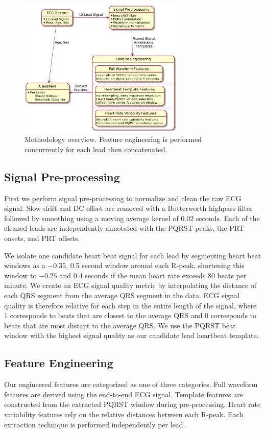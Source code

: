 \documentclass[twocolumn]{cinc}
\begin{document}
\begin{figure}[ht]
  \centering
  \includegraphics[width=7.9cm]{fig/methodology.png}
  \caption{Methodology overview. Feature engineering is performed concurrently for each lead then concatenated.}
  \label{fig:methodology}
\end{figure}

\subsection{Signal Pre-processing}

First we perform signal pre-processing to normalize and clean the raw ECG signal.
Slow drift and DC offset are removed with a Butterworth highpass filter followed by smoothing using a moving average kernel of 0.02 seconds.
Each of the cleaned leads are independently annotated with the PQRST peaks, the PRT onsets, and PRT offsets.

We isolate one candidate heart beat signal for each lead by segmenting heart beat windows as a $-0.35$, 0.5 second window around each R-peak, shortening this window to $-0.25$ and 0.4 seconds if the mean heart rate exceeds 80 beats per minute.
We create an ECG signal quality metric by interpolating the distance of each QRS segment from the average QRS segment in the data.
ECG signal quality is therefore relative for each step in the entire length of the signal, where 1 corresponds to beats that are closest to the average QRS and 0 corresponds to beats that are most distant to the average QRS.
We use the PQRST beat window with the highest signal quality as our candidate lead heartbeat template.

\subsection{Feature Engineering}

Our engineered features are categorized as one of three categories.
Full waveform features are derived using the end-to-end ECG signal.
Template features are constructed from the extracted PQRST window during pre-processing.
Heart rate variability features rely on the relative distances between each R-peak.
Each extraction technique is performed independently per lead.
\end{document}
